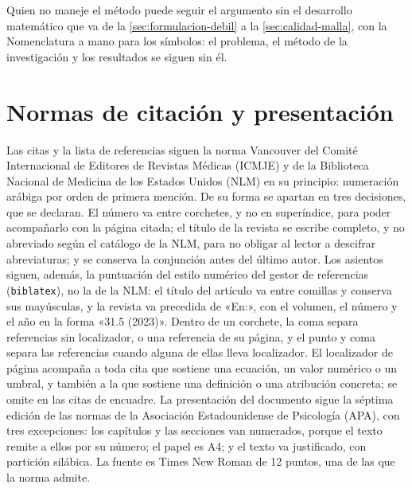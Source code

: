 Quien no maneje el método puede seguir el argumento sin el desarrollo matemático que va de la \autoref{sec:formulacion-debil} a la \autoref{sec:calidad-malla}, con la Nomenclatura a mano para los símbolos: el problema, el método de la investigación y los resultados se siguen sin él.

\section*{Normas de citación y presentación}

Las citas y la lista de referencias siguen la norma Vancouver del Comité Internacional de Editores de Revistas Médicas (ICMJE) y de la Biblioteca Nacional de Medicina de los Estados Unidos (NLM) en su principio: numeración arábiga por orden de primera mención. De su forma se apartan en tres decisiones, que se declaran. El número va entre corchetes, y no en superíndice, para poder acompañarlo con la página citada; el título de la revista se escribe completo, y no abreviado según el catálogo de la NLM, para no obligar al lector a descifrar abreviaturas; y se conserva la conjunción antes del último autor. Los asientos siguen, además, la puntuación del estilo numérico del gestor de referencias (\texttt{biblatex}), no la de la NLM: el título del artículo va entre comillas y conserva sus mayúsculas, y la revista va precedida de «En:», con el volumen, el número y el año en la forma «31.5 (2023)». Dentro de un corchete, la coma separa referencias sin localizador, o una referencia de su página, y el punto y coma separa las referencias cuando alguna de ellas lleva localizador. El localizador de página acompaña a toda cita que sostiene una ecuación, un valor numérico o un umbral, y también a la que sostiene una definición o una atribución concreta; se omite en las citas de encuadre. La presentación del documento sigue la séptima edición de las normas de la Asociación Estadounidense de Psicología (APA), con tres excepciones: los capítulos y las secciones van numerados, porque el texto remite a ellos por su número; el papel es A4; y el texto va justificado, con partición silábica. La fuente es Times New Roman de 12 puntos, una de las que la norma admite.
